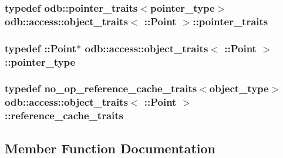 \subsubsection[{pointer\+\_\+traits}]{\setlength{\rightskip}{0pt plus 5cm}typedef odb\+::pointer\+\_\+traits$<${\bf pointer\+\_\+type}$>$ odb\+::access\+::object\+\_\+traits$<$ \+::{\bf Point} $>$\+::{\bf pointer\+\_\+traits}}\label{classodb_1_1access_1_1object__traits_3_01_1_1_point_01_4_ad0c4599941aa4675b6d489b2d88f31a2}
\hypertarget{classodb_1_1access_1_1object__traits_3_01_1_1_point_01_4_af346f01f87941f322ac52af87a7b64bb}{}
\subsubsection[{pointer\+\_\+type}]{\setlength{\rightskip}{0pt plus 5cm}typedef \+::{\bf Point}$\ast$ odb\+::access\+::object\+\_\+traits$<$ \+::{\bf Point} $>$\+::{\bf pointer\+\_\+type}}\label{classodb_1_1access_1_1object__traits_3_01_1_1_point_01_4_af346f01f87941f322ac52af87a7b64bb}
\hypertarget{classodb_1_1access_1_1object__traits_3_01_1_1_point_01_4_a0ee5afc48c297c3b21cfb6c214267714}{}
\subsubsection[{reference\+\_\+cache\+\_\+traits}]{\setlength{\rightskip}{0pt plus 5cm}typedef no\+\_\+op\+\_\+reference\+\_\+cache\+\_\+traits$<${\bf object\+\_\+type}$>$ odb\+::access\+::object\+\_\+traits$<$ \+::{\bf Point} $>$\+::{\bf reference\+\_\+cache\+\_\+traits}}\label{classodb_1_1access_1_1object__traits_3_01_1_1_point_01_4_a0ee5afc48c297c3b21cfb6c214267714}


\subsection{Member Function Documentation}
\hypertarget{classodb_1_1access_1_1object__traits_3_01_1_1_point_01_4_a99b7b3f395f4ec5550bdf95756f9ac0e}{}

